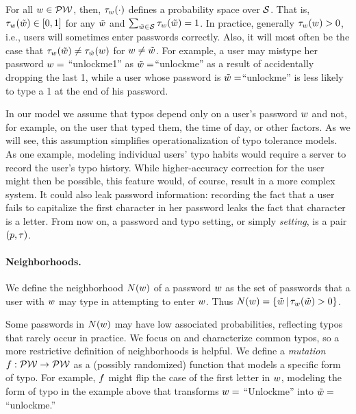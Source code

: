 For all ${w} \in \mathcal{PW}$, then, $\tau_{w}(\cdot)$ defines a
probability space over $\mathcal{S}$. That is,
$\tau_{w}(\tilde{w}) \in [0,1]$ for any $\tilde{w}$ and
$\sum_{\tilde{w} \in \mathcal{S}} \tau_{{w}}(\tilde{w}) = 1$. In practice,
generally $\tau_{w}({w}) > 0$, i.e., users will sometimes enter
passwords correctly.  Also, it will most often be the case that
$\tau_{{w}}(\tilde{w}) \neq \tau_{\tilde{w}}({w})$ for
${w} \ne \tilde{w}$. For example, a user may mistype her password
${w} =$ ``unlockme1'' as $\tilde{w} =$``unlockme'' as a result of
accidentally dropping the last 1, while a user whose password is
$\tilde{w} =$``unlockme'' is less likely to type a 1 at the end of his password.


In our model we assume that typos depend only on a user's password
${w}$ and not, for example, on the user that typed them, the time of
day, or other factors.  As we will see, this assumption simplifies
operationalization of typo tolerance models. As one example, modeling
individual users' typo habits would require a server to record the
user's typo history.  While higher-accuracy correction for the user
might then be possible, this feature would, of course, result in a
more complex system. It could also leak password information: recording
the fact that a user fails to capitalize the first character in her
password leaks the fact that character is a letter.
From now on, 
a password and typo setting, or simply \emph{setting}, is a
pair $(p,\tau)$.



\iffalse
\paragraph{Neighborhoods.} We define the neighborhood $N({w})$ of a password
${w}$ as the set of passwords that a user with ${w}$ may type in attempting to
enter ${w}$. Thus $N({w}) = \{\tilde{w} \,|\, \tau_{{w}}(\tilde{w}) > 0\}$. 

Some passwords in $N({w})$ may have low associated probabilities,
reflecting typos that rarely occur in practice. We focus on and
characterize common typos, so a more restrictive definition of neighborhoods is
helpful. We define a {\em mutation} $f: \mathcal{PW} \rightarrow \mathcal{PW}$ as a (possibly
randomized) function that models a specific form of typo. For example, $f$
might flip the case of the first letter in ${w}$, modeling the form of typo in
the example above that transforms ${w} =$ ``Unlockme'' into $\tilde{w}
=$``unlockme.'' 

